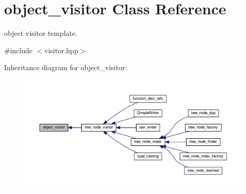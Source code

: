 \hypertarget{classobject__visitor}{}\section{object\+\_\+visitor Class Reference}
\label{classobject__visitor}


object visitor template.  




{\ttfamily \#include $<$visitor.\+hpp$>$}



Inheritance diagram for object\+\_\+visitor\+:
\nopagebreak
\begin{figure}[H]
\begin{center}
\leavevmode
\includegraphics[width=350pt]{d8/d99/classobject__visitor__inherit__graph}
\end{center}
\end{figure}
